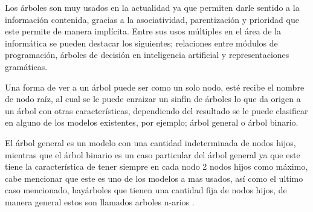 Los \'arboles son muy usados en la actualidad ya que permiten  darle sentido a
 la informaci\'on contenida, gracias a la asociatividad, parentizaci\'on y
 prioridad que este permite de manera impl\'icita. Entre sus usos m\'ultiples en
 el \'area de la inform\'atica se pueden destacar los  siguientes; relaciones
 entre m\'odulos de programaci\'on, \'arboles de decisi\'on en inteligencia artificial
 y representaciones gram\'aticas\cite{gutierrez1999estructuras}.  

Una forma de ver a un \'arbol puede ser como un solo nodo, est\'e recibe el nombre
 de  nodo ra\'iz, al cual se le puede enraizar un sinf\'in de \'arboles lo que da
 origen  a un \'arbol con otras caracter\'isticas, dependiendo del resultado se le
 puede clasificar en alguno de los modelos existentes, por ejemplo; \'arbol 
 general o \'arbol binario\cite{gutierrez1999estructuras}. 

El \'arbol general es un modelo con una cantidad indeterminada de nodos hijos,
 mientras que el \'arbol binario es un caso particular del \'arbol general ya que
 este tiene la caracter\'istica de tener siempre en cada nodo 2 nodos hijos como
 m\'aximo, cabe mencionar que este es uno de los modelos a mas usados, as\'i como
 el ultimo caso mencionado, hay\'arboles que tienen una cantidad fija de nodos
 hijos, de manera general estos son llamados arboles n-arios
 \cite{gutierrez1999estructuras}.